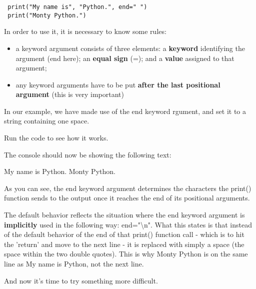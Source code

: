 \documentclass[a4paper,10pt]{article}
\begin{document}
\begin{verbatim}
 print("My name is", "Python.", end=" ")
 print("Monty Python.")
\end{verbatim}



In order to use it, it is necessary to know some rules:
\begin{itemize}
 \item a keyword argument consists of three elements: a \textbf{keyword} identifying the argument ({\selectfont end} here); an \textbf{equal sign} ({\selectfont =}); and a \textbf{value} assigned to that argument;
 \item any keyword arguments have to be put \textbf{after the last positional argument} (this is very important)
\end{itemize}

In our example, we have made use of the {\selectfont end} keyword rgument, and set it to a string containing one space.
\newline

Run the code to see how it works.
\newline

The console should now be showing the following text:
\newline

{\selectfont My name is Python. Monty Python.}
\newline

As you can see, the {\selectfont end} keyword argument determines the characters the {\selectfont print()} function sends to the output once it reaches the end of its positional arguments.
\newline

The default behavior reflects the situation where the {\selectfont end} keyword argument is \textbf{implicitly} used in the following way: {\selectfont end="\textbackslash n"}. What this states is that instead of the default behavior of the end of that {\selectfont print()} function call - which is to hit the 'return' and move to the next line - it is replaced with simply a space (the space within the two double quotes). This is why {\selectfont Monty Python} is on the same line as {\selectfont My name is Python}, not the next line.
\newline

And now it's time to try something more difficult.
\end{document}
